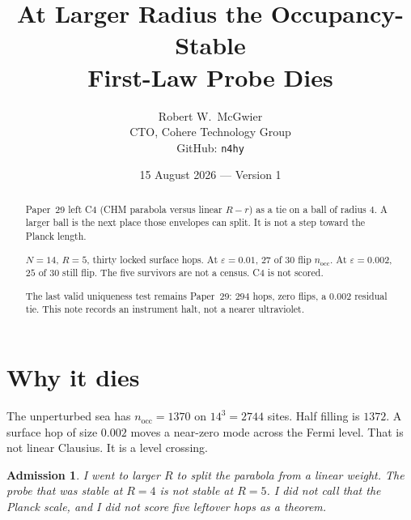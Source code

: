 \documentclass[11pt]{article}
\title{\textbf{At Larger Radius the Occupancy-Stable\\
First-Law Probe Dies}}
\author{Robert W.\ McGwier\\
\small CTO, Cohere Technology Group\\
\small GitHub: \texttt{n4hy}}
\date{15 August 2026 --- Version 1}
\newtheorem*{admission}{Admission}
\begin{document}
\maketitle

\begin{abstract}
\noindent
Paper~29 left C4 (CHM parabola versus linear $R-r$) as a tie on
a ball of radius $4$. A larger ball is the next place those
envelopes can split. It is not a step toward the Planck length.

$N=14$, $R=5$, thirty locked surface hops. At $\varepsilon=0.01$,
$27$ of $30$ flip $n_{\mathrm{occ}}$. At $\varepsilon=0.002$,
$25$ of $30$ still flip. The five survivors are not a census.
C4 is not scored.

The last valid uniqueness test remains Paper~29: $294$ hops,
zero flips, a $0.002$ residual tie. This note records an
instrument halt, not a nearer ultraviolet.
\end{abstract}

\section{Why it dies}

The unperturbed sea has $n_{\mathrm{occ}}=1370$ on $14^3=2744$
sites. Half filling is $1372$. A surface hop of size $0.002$
moves a near-zero mode across the Fermi level. That is not
linear Clausius. It is a level crossing.

\begin{admission}
I went to larger $R$ to split the parabola from a linear weight.
The probe that was stable at $R=4$ is not stable at $R=5$. I did
not call that the Planck scale, and I did not score five leftover
hops as a theorem.
\end{admission}
\end{document}
